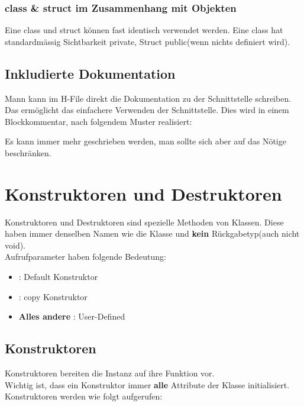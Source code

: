 \subsubsection{class \& struct im Zusammenhang mit Objekten}

Eine class und struct können fast identisch verwendet werden. 
Eine class hat standardmässig Sichtbarkeit private, Struct public(wenn nichts definiert wird).

\subsection{Inkludierte Dokumentation}

Mann kann im H-File direkt die Dokumentation zu der Schnittstelle schreiben. 
Das ermöglicht das einfachere Verwenden der Schnittstelle.
Dies wird in einem Blockkommentar, nach folgendem Muster realisiert:



Es kann immer mehr geschrieben werden, man sollte sich aber auf das Nötige beschränken.

\section{Konstruktoren und Destruktoren}

Konstruktoren und Destruktoren sind spezielle Methoden von Klassen. 
Diese haben immer denselben Namen wie die Klasse und \textbf{kein} Rückgabetyp(auch nicht void).\\
Aufrufparameter haben folgende Bedeutung:

\begin{itemize}[itemsep=1pt, parsep=0pt]
    \item \textbf{} : Default Konstruktor
    \item \textbf{} : copy Konstruktor
    \item \textbf{Alles andere} : User-Defined
\end{itemize}

\subsection{Konstruktoren}

Konstruktoren bereiten die Instanz auf ihre Funktion vor. \\

Wichtig ist, dass ein Konstruktor immer \textbf{alle} Attribute der Klasse initialisiert.
Konstruktoren werden wie folgt aufgerufen:\\

